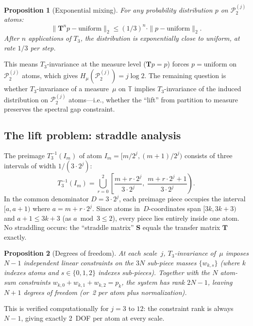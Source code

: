 \documentclass[11pt,a4paper]{article}
\newtheorem{proposition}{Proposition}
\begin{document}
\begin{proposition}[Exponential mixing]
\label{prop:mixing}
For any probability distribution $p$ on $\mathcal{P}_2^{(j)}$ atoms:
\[
\|\mathbf{T}^n p - \text{uniform}\|_2 \leq (1/3)^n \cdot \|p - \text{uniform}\|_2.
\]
After $n$ applications of $T_3$, the distribution is exponentially close
to uniform, at rate $1/3$ per step.
\end{proposition}

This means $T_3$-invariance at the measure level ($\mathbf{T} p = p$)
forces $p = \text{uniform}$ on $\mathcal{P}_2^{(j)}$ atoms, which gives
$H_\mu(\mathcal{P}_2^{(j)}) = j \log 2$.
The remaining question is whether $T_3$-invariance of a measure~$\mu$
on $\mathbb{T}$ implies $T_3$-invariance of the induced distribution on
$\mathcal{P}_2^{(j)}$ atoms---i.e., whether the ``lift'' from partition
to measure preserves the spectral gap constraint.

\subsection{The lift problem: straddle analysis}

The preimage $T_3^{-1}(I_m)$ of atom $I_m = [m/2^j, (m+1)/2^j)$
consists of three intervals of width $1/(3 \cdot 2^j)$:
\[
T_3^{-1}(I_m) = \bigcup_{r=0}^{2}
\left[\frac{m + r \cdot 2^j}{3 \cdot 2^j},\;
      \frac{m + r \cdot 2^j + 1}{3 \cdot 2^j}\right).
\]
In the common denominator $D = 3 \cdot 2^j$, each preimage piece
occupies the interval $[a, a+1)$ where $a = m + r \cdot 2^j$.
Since atoms in~$D$-coordinates span $[3k, 3k+3)$ and
$a + 1 \leq 3k + 3$ (as $a \bmod 3 \leq 2$),
every piece lies entirely inside one atom.
No straddling occurs: the ``straddle matrix'' $\mathbf{S}$ equals
the transfer matrix $\mathbf{T}$ exactly.

\begin{proposition}[Degrees of freedom]
\label{prop:dof}
At each scale~$j$, $T_3$-invariance of~$\mu$ imposes $N-1$
independent linear constraints on the $3N$ sub-piece masses
$\{w_{k,s}\}$ (where $k$ indexes atoms and $s \in \{0,1,2\}$ indexes
sub-pieces).
Together with the $N$ atom-sum constraints
$w_{k,0} + w_{k,1} + w_{k,2} = p_k$,
the system has rank $2N - 1$, leaving $N + 1$ degrees of freedom
(or~2 per atom plus normalization).
\end{proposition}

This is verified computationally for $j = 3$ to $12$: the constraint
rank is always $N-1$, giving exactly 2~DOF per atom at every scale.
\end{document}
